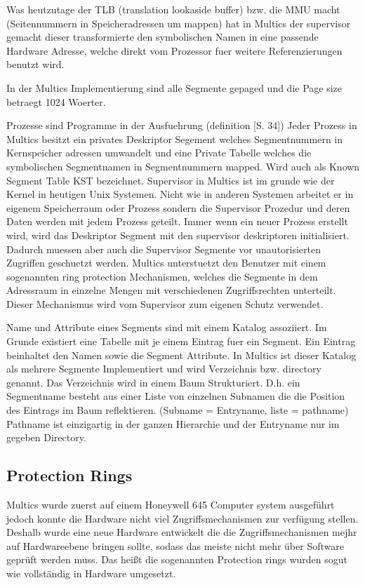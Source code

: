 \documentclass[9pt,technote]{IEEEtran}
\begin{document}
		 Was heutzutage der TLB (translation lookaside buffer) bzw. die MMU macht (Seitennummern in Speicheradressen um mappen) hat in Multics der supervisor gemacht
		 dieser transformierte den symbolischen Namen in eine passende Hardware Adresse, welche direkt vom Prozessor fuer weitere Referenzierungen benutzt wird.
		 
		 In der Multics Implementierung sind alle Segmente gepaged und die Page size betraegt 1024 Woerter.
		 
		 Prozesse sind Programme in der Ausfuehrung (definition \cite{inproc:multics}[S. 34]) Jeder Prozess in Multics besitzt ein privates Deskriptor Segement welches
		 Segmentnummern in Kernspeicher adressen umwandelt und eine Private Tabelle welches die symbolischen Segmentnamen in Segmentnummern mapped. Wird
		 auch als Known Segment Table KST bezeichnet. Supervisor in Multics ist im grunde wie der Kernel in heutigen Unix Systemen.
		 Nicht wie in anderen Systemen arbeitet er in eigenem Speicherraum oder Prozess sondern die Supervisor Prozedur und deren Daten werden mit jedem Prozess geteilt. 
		 Immer wenn ein neuer Prozess erstellt wird, wird das Deskriptor Segment mit den supervisor deskriptoren initialisiert. Dadurch muessen aber auch die Supervisor
		 Segmente vor unautorisierten Zugriffen geschuetzt werden. Multics unterstuetzt den Benutzer mit einem sogenannten ring protection Mechanismen,
		 welches die Segmente in dem Adressraum in einzelne Mengen mit verschiedenen Zugriffsrechten unterteilt. Dieser Mechanismus wird vom Supervisor zum
		 eigenen Schutz verwendet.
		 
		 Name und Attribute eines Segments sind mit einem Katalog assoziiert. Im Grunde existiert eine Tabelle mit je einem Eintrag fuer ein Segment. 
		 Ein Eintrag beinhaltet den Namen sowie die Segment Attribute. In Multics ist dieser Katalog als mehrere
		 Segmente Implementiert und wird Verzeichnis bzw. directory genannt. Das Verzeichnis wird in einem Baum Strukturiert.
		 D.h. ein Segmentname besteht aus einer Liste von einzelnen Subnamen die die Position des Eintrags im Baum reflektieren. (Subname = Entryname, liste = pathname)
		 Pathname ist einzigartig in der ganzen Hierarchie und der Entryname nur im gegeben Directory.
  \subsection{Protection Rings}
    Multics wurde zuerst auf einem Honeywell 645 Computer system ausgef\"uhrt jedoch konnte die Hardware nicht viel Zugriffsmechanismen zur verf\"ugung stellen.
    Deshalb wurde eine neue Hardware entwickelt die die Zugriffsmechanismen mejhr auf Hardwareebene bringen sollte, sodass das meiste nicht mehr \"uber Software
    gepr\"uft werden muss. Das hei\ss t die sogenannten Protection rings wurden sogut wie vollst\"andig in Hardware umgesetzt. \cite{inproc:protec-rings}
    
\end{document}
